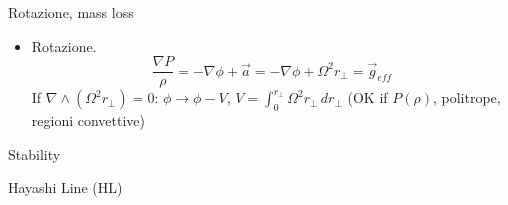 \begin{frame}{Rotazione, mass loss}
\begin{itemize}
\item Rotazione. \[\frac{\nabla P}{\rho}=-\nabla\phi+\vec{a}=-\nabla\phi+\Omega^2r_{\perp}=\vec{g}_{eff}\]
If $\nabla\wedge(\Omega^2r_{\perp})=0$: $\phi\to\phi-V$, $V=\int_0^{r_{\perp}}\Omega^2r_{\perp}\,dr_{\perp}$ (OK if $P(\rho)$, politrope, regioni convettive)
\end{itemize}
\end{frame}

\begin{frame}{Stability}

\end{frame}

\begin{frame}{Hayashi Line (HL)}

\end{frame}
